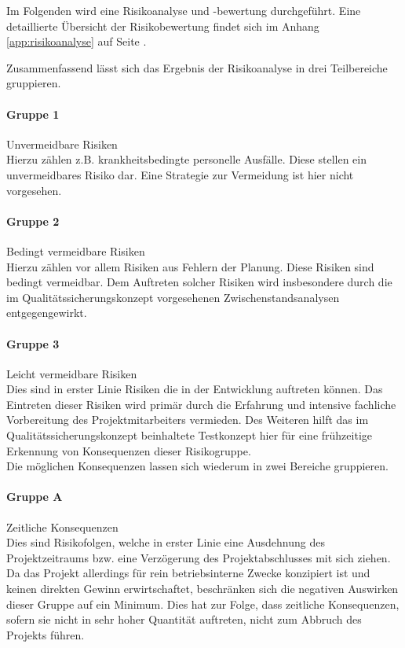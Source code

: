\documentclass[12pt, xcolor=dvipsnames]{scrartcl}
\begin{document}
Im Folgenden wird eine Risikoanalyse und -bewertung durchgeführt.
Eine detaillierte Übersicht der Risikobewertung findet sich im Anhang \ref{app:risikoanalyse} auf Seite \pageref{app:risikoanalyse}.

Zusammenfassend lässt sich das Ergebnis der Risikoanalyse in drei Teilbereiche gruppieren.

\paragraph{Gruppe 1}
Unvermeidbare Risiken \\
Hierzu zählen z.B. krankheitsbedingte personelle Ausfälle. Diese stellen ein unvermeidbares Risiko dar. Eine Strategie zur Vermeidung ist hier nicht vorgesehen.\\

\paragraph{Gruppe 2}
Bedingt vermeidbare Risiken \\
Hierzu zählen vor allem Risiken aus Fehlern der Planung. Diese Risiken sind bedingt vermeidbar. Dem Auftreten solcher Risiken wird insbesondere durch die im  Qualitätssicherungskonzept vorgesehenen Zwischenstandsanalysen entgegengewirkt.

\paragraph{Gruppe 3}
Leicht vermeidbare Risiken \\
Dies sind in erster Linie Risiken die in der Entwicklung auftreten können. Das Eintreten dieser Risiken wird primär durch die Erfahrung und intensive fachliche Vorbereitung des Projektmitarbeiters vermieden. Des Weiteren hilft das im Qualitätssicherungskonzept beinhaltete Testkonzept hier für eine frühzeitige Erkennung von Konsequenzen dieser Risikogruppe. \\

Die möglichen Konsequenzen lassen sich wiederum in zwei Bereiche gruppieren.

\paragraph{Gruppe A} Zeitliche Konsequenzen \\
Dies sind Risikofolgen, welche in erster Linie eine Ausdehnung des Projektzeitraums bzw. eine Verzögerung des Projektabschlusses mit sich ziehen. Da das Projekt allerdings für rein betriebsinterne Zwecke konzipiert ist und keinen direkten Gewinn erwirtschaftet, beschränken sich die negativen Auswirken dieser Gruppe auf ein Minimum. Dies hat zur Folge, dass zeitliche Konsequenzen, sofern sie nicht in sehr hoher Quantität auftreten, nicht zum Abbruch des Projekts führen.
\end{document}
